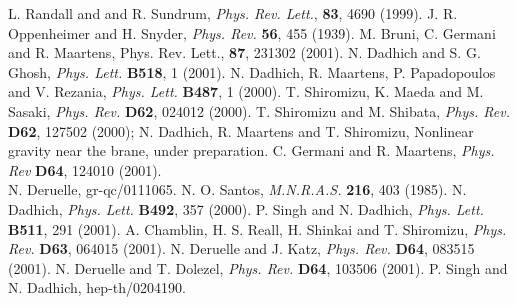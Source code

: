 \documentclass[a4paper,twocolumn,showpacs,preprintnumbers,amsmath,amssymb]{revtex4}
\begin{document}
\begin{thebibliography}{99}
L. Randall and and R. Sundrum, {\em Phys. Rev. Lett.}, {\bf 83}, 4690 
(1999). 
J. R. Oppenheimer and H. Snyder, {\em Phys. Rev.} {\bf 56}, 455 (1939).
M. Bruni, C. Germani and R. Maartens, {Phys. Rev. Lett.}, {\bf 87}, 231302 (2001).
N. Dadhich and S. G. Ghosh,  {\em Phys. Lett.} {\bf B518}, 1 (2001).
N. Dadhich, R. Maartens, P. Papadopoulos and V. Rezania, {\em Phys. Lett.} 
{\bf B487}, 1 (2000).
T. Shiromizu, K. Maeda and M. Sasaki, {\em Phys. Rev.} {\bf D62}, 024012 
(2000).
T. Shiromizu and M. Shibata,  {\em Phys. Rev.} {\bf D62}, 127502 (2000);
N. Dadhich, R. Maartens and T. Shiromizu, Nonlinear gravity near the brane,
 under preparation.
C. Germani and R. Maartens, {\em Phys. Rev} {\bf D64}, 124010 (2001).\\
N. Deruelle, gr-qc/0111065.
N. O. Santos, {\em M.N.R.A.S.}  {\bf 216}, 403 (1985).
N. Dadhich,  {\em Phys. Lett.} {\bf B492}, 357 (2000).
P. Singh and N. Dadhich, {\em Phys. Lett.} {\bf B511}, 291 (2001).
A. Chamblin, H. S. Reall, H. Shinkai and T. Shiromizu, {\em Phys. Rev.} 
{\bf D63}, 064015 (2001).
N. Deruelle and J. Katz, {\em Phys. Rev.} {\bf D64}, 083515 (2001).
N. Deruelle and T. Dolezel, {\em Phys. Rev.} {\bf D64}, 103506 (2001).
P. Singh and N. Dadhich, hep-th/0204190.
\end{thebibliography}
\end{document}
